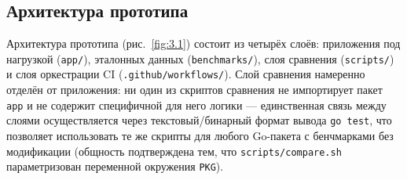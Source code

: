 \documentclass[12pt,a4paper]{article}
\numberwithin{equation}{section}
\begin{document}
\subsection{Архитектура прототипа}
\label{sec:3.2}

Архитектура прототипа (рис.~\ref{fig:3.1}) состоит из четырёх слоёв:
приложения под нагрузкой (\texttt{app/\allowbreak }), эталонных данных
(\texttt{benchmarks/\allowbreak }), слоя сравнения (\texttt{scripts/\allowbreak }) и слоя оркестрации
CI (\texttt{.github/\allowbreak workflows/\allowbreak }). Слой сравнения намеренно отделён от
приложения: ни один из скриптов сравнения не импортирует пакет
\texttt{app} и не содержит специфичной для него логики — единственная связь
между слоями осуществляется через текстовый/бинарный формат вывода
\texttt{go test}, что позволяет использовать те же скрипты для любого
Go-пакета с бенчмарками без модификации (общность подтверждена тем, что
\texttt{scripts/\allowbreak compare.sh} параметризован переменной окружения
\texttt{PKG}).
\end{document}
